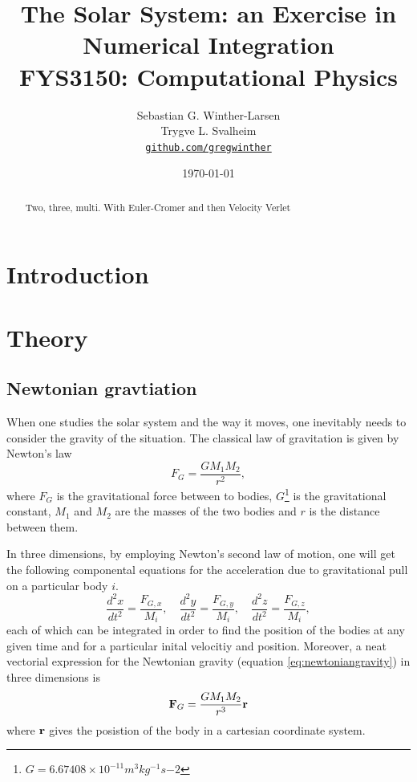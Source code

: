 \documentclass[10pt,a4paper]{amsart}
\title[Simulation of the Solar System]{The Solar System: an Exercise in Numerical Integration \\
  \hrulefill\small{ FYS3150: Computational Physics }\hrulefill}
\author[Winther-Larsen \& Svalheim]{Sebastian G. Winther-Larsen \\ 
Trygve L. Svalheim \\
\href{https://github.com/gregwinther/FYS3150/}{\texttt{github.com/gregwinther}}}
\date{\today}
\begin{document}
\begin{titlepage}
\begin{abstract}
Two, three, multi. With Euler-Cromer and then Velocity Verlet
\end{abstract}
\maketitle
\tableofcontents
\end{titlepage}

\section{Introduction}

\section{Theory}

\subsection{Newtonian gravtiation}
When one studies the solar system and the way it moves, one inevitably needs to consider the gravity of the situation. The classical law of gravitation is given by Newton's law
\begin{equation}
\label{eq:newtoniangravity}
F_G = \frac{GM_1M_2}{r^2},
\end{equation} 
where $F_G$ is the gravitational force between to bodies, $G$\footnote{$G=6.67408 \times 10^{-11} m^3 kg^{-1} s{-2}$} is the gravitational constant, $M_1$ and $M_2$ are the masses of the two bodies and $r$ is the distance between them.

In three dimensions, by employing Newton's second law of motion, one will get the following componental equations for the acceleration due to gravitational pull on a particular body $i$.
\begin{equation}
\label{eq:componentalnewton}
\frac{d^2x}{dt^2} = \frac{F_{G,x}}{M_i}, \quad
\frac{d^2y}{dt^2} = \frac{F_{G,y}}{M_i}, \quad
\frac{d^2z}{dt^2} = \frac{F_{G,z}}{M_i},
\end{equation}
each of which can be integrated in order to find the position of the bodies at any given time and for a particular inital velocitiy and position. Moreover, a neat vectorial expression for the Newtonian gravity (equation \ref{eq:newtoniangravity}) in three dimensions is
\begin{equation}
\vb{F}_G = \frac{GM_1M_2}{r^3}\vb{r}
\end{equation}
where $\vb{r}$ gives the posistion of the body in a cartesian coordinate system.
\end{document}
